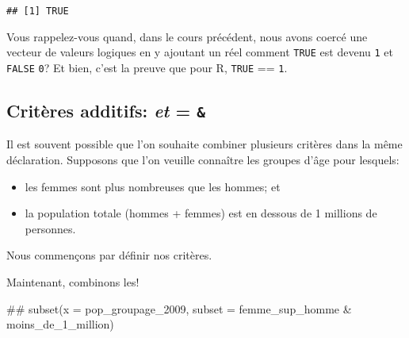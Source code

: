 \documentclass[]{book}
\newenvironment{Shaded}{\begin{snugshade}}{\end{snugshade}}
\newcommand{\DecValTok}[1]{\textcolor[rgb]{0.00,0.00,0.81}{#1}}
\newcommand{\StringTok}[1]{\textcolor[rgb]{0.31,0.60,0.02}{#1}}
\newcommand{\CommentTok}[1]{\textcolor[rgb]{0.56,0.35,0.01}{\textit{#1}}}
\newcommand{\OperatorTok}[1]{\textcolor[rgb]{0.81,0.36,0.00}{\textbf{#1}}}
\newcommand{\NormalTok}[1]{#1}
\begin{document}
\begin{verbatim}
## [1] TRUE
\end{verbatim}

Vous rappelez-vous quand, dans le cours précédent, nous avons coercé une
vecteur de valeurs logiques en y ajoutant un réel comment \texttt{TRUE}
est devenu \texttt{1} et \texttt{FALSE} \texttt{0}? Et bien, c'est la
preuve que pour R, \texttt{TRUE} == \texttt{1}.

\subsection{\texorpdfstring{Critères additifs: \emph{et} =
\texttt{\&}}{Critères additifs: et = \&}}\label{criteres-additifs-et}

Il est souvent possible que l'on souhaite combiner plusieurs critères
dans la même déclaration. Supposons que l'on veuille connaître les
groupes d'âge pour lesquels:

\begin{itemize}
\item
  les femmes sont plus nombreuses que les hommes; et
\item
  la population totale (hommes + femmes) est en dessous de 1 millions de
  personnes.
\end{itemize}

Nous commençons par définir nos critères.

\begin{Shaded}
\end{Shaded}

Maintenant, combinons les!

\begin{Shaded}
\begin{Highlighting}[]
\NormalTok{## subset(x = pop_groupage_2009, subset = femme_sup_homme & moins_de_1_million)}
\end{Highlighting}
\end{Shaded}
\end{document}
